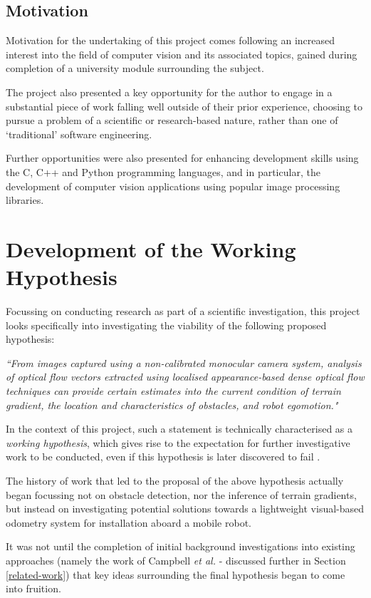 \subsection{Motivation}

Motivation for the undertaking of this project comes following an increased interest into the field of computer vision and its associated topics, gained during completion of a university module surrounding the subject.

The project also presented a key opportunity for the author to engage in a substantial piece of work falling well outside of their prior experience, choosing to pursue a problem of a scientific or research-based nature, rather than one of `traditional' software engineering. 

Further opportunities were also presented for enhancing development skills using the C, C++ and Python programming languages, and in particular, the development of computer vision applications using popular image processing libraries.

\section{Development of the Working Hypothesis} 

Focussing on conducting research as part of a scientific investigation, this project looks specifically into investigating the viability of the following proposed hypothesis: 

\indent \textit{``From images captured using a non-calibrated monocular camera system, analysis of optical flow vectors extracted using localised appearance-based dense optical flow techniques can provide certain estimates into the current condition of terrain gradient, the location and characteristics of obstacles, and robot egomotion."}
 
In the context of this project, such a statement is technically characterised as a \textit{working hypothesis}, which gives rise to the expectation for further investigative work to be conducted, even if this hypothesis is later discovered to fail \cite{century}. 

The history of work that led to the proposal of the above hypothesis actually began focussing not on obstacle detection, nor the inference of terrain gradients, but instead on investigating potential solutions towards a lightweight visual-based odometry system for installation aboard a mobile robot. 

It was not until the completion of initial background investigations into existing approaches (namely the work of Campbell \textit{et al.} \cite{campbell} - discussed further in Section \ref{related-work}) that key ideas surrounding the final hypothesis began to come into fruition. 

